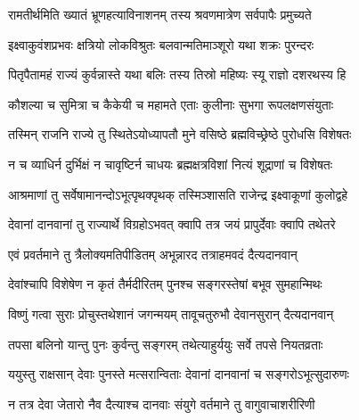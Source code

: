 

\translink{}

\storymeta


\twolineshloka
{रामतीर्थमिति ख्यातं भ्रूणहत्याविनाशनम्}
{तस्य श्रवणमात्रेण सर्वपापैः प्रमुच्यते} %

\twolineshloka
{इक्ष्वाकुवंशप्रभवः क्षत्रियो लोकविश्रुतः}
{बलवान्मतिमाञ्शूरो यथा शक्रः पुरन्दरः} %

\twolineshloka
{पितृपैतामहं राज्यं कुर्वन्नास्ते यथा बलिः}
{तस्य तिस्रो महिष्यः स्यू राज्ञो दशरथस्य हि} %

\twolineshloka
{कौशल्या च सुमित्रा च कैकेयी च महामते}
{एताः कुलीनाः सुभगा रूपलक्षणसंयुताः} %

\twolineshloka
{तस्मिन् राजनि राज्ये तु स्थितेऽयोध्यापतौ मुने}
{वसिष्ठे ब्रह्मविच्छ्रेष्ठे पुरोधसि विशेषतः} %

\twolineshloka
{न च व्याधिर्न दुर्भिक्षं न चावृष्टिर्न चाधयः}
{ब्रह्मक्षत्रविशां नित्यं शूद्राणां च विशेषतः} %

\twolineshloka
{आश्रमाणां तु सर्वेषामानन्दोऽभूत्पृथक्पृथक्}
{तस्मिञ्शासति राजेन्द्र इक्ष्वाकूणां कुलोद्वहे} %

\twolineshloka
{देवानां दानवानां तु राज्यार्थे विग्रहोऽभवत्}
{क्वापि तत्र जयं प्रापुर्देवाः क्वापि तथेतरे} %

\twolineshloka
{एवं प्रवर्तमाने तु त्रैलोक्यमतिपीडितम्}
{अभून्नारद तत्राहमवदं दैत्यदानवान्} %

\twolineshloka
{देवांश्चापि विशेषेण न कृतं तैर्मदीरितम्}
{पुनश्च सङ्गरस्तेषां बभूव सुमहान्मिथः} %

\twolineshloka
{विष्णुं गत्वा सुराः प्रोचुस्तथेशानं जगन्मयम्}
{तावूचतुरुभौ देवानसुरान् दैत्यदानवान्} %

\twolineshloka
{तपसा बलिनो यान्तु पुनः कुर्वन्तु सङ्गरम्}
{तथेत्याहुर्ययुः सर्वे तपसे नियतव्रताः} %

\twolineshloka
{ययुस्तु राक्षसान् देवाः पुनस्ते मत्सरान्विताः}
{देवानां दानवानां च सङ्गरोऽभूत्सुदारुणः} %

\twolineshloka
{न तत्र देवा जेतारो नैव दैत्याश्च दानवाः}
{संयुगे वर्तमाने तु वागुवाचाशरीरिणी} %


